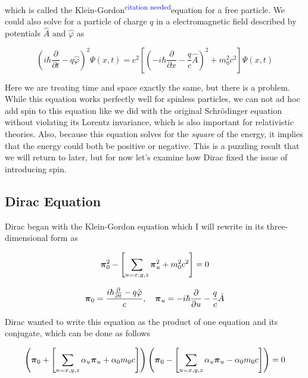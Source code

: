 \documentclass[12pt]{report}
\newcommand{\citethis}{\textsuperscript{\textcolor{blue}{citation needed}}} %
\begin{document}
which is called the Klein-Gordon\citethis equation for a free particle. We could also solve for a particle of charge $q$ in a electromagnetic field described by potentials $\hat{A}$ and $\hat{\varphi}$ as

\begin{equation}
\label{eq:klein-gord_elec_mag}
\left(i\hbar\frac{\partial}{\partial t} -q\hat{\varphi}\right)^{2}\Psi(x, t) = c^{2}\left[\left(-i\hbar\frac{\partial}{\partial x} - \frac{q}{c}\hat{A}\right)^{2} + m_{0}^{2}c^{2}\right]\Psi(x,t)
\end{equation}

Here we are treating time and space exactly the same, but there is a problem. While this equation works perfectly well for spinless particles, we can not ad hoc add spin to this equation like we did with the original Schr\"{o}dinger equation without violating its Lorentz invariance, which is also important for relativistic theories. Also, because this equation solves for the \textit{square} of the energy, it implies that the energy could both be positive or negative. This is a puzzling result that we will return to later, but for now let's examine how Dirac fixed the issue of introducing spin. 

\subsection{Dirac Equation}

Dirac began with the Klein-Gordon equation which I will rewrite in its three-dimensional form as

\begin{equation}
\label{eq:dirac_3D}
{\bf{\pi}}_{0}^{2} - \left[\sum_{u=x,y,z}{\bf{\pi}}_{u}^{2} + m_{0}^{2}c^{2}\right] = 0
\end{equation}

\begin{equation}
\label{eq:dirac_3D_def}
{\bf{\pi}}_{0} = \frac{i\hbar\frac{\partial}{\partial t} -q\hat{\varphi}}{c}, \quad {\bf{\pi}}_{u} = -i\hbar\frac{\partial}{\partial u} - \frac{q}{c}\hat{A}
\end{equation}

Dirac wanted to write this equation as the product of one equation and its conjugate, which can be done as follows

\begin{equation}
\label{eq:dirac_3D_conj}
\left({\bf{\pi}}_{0} + \left[\sum_{u=x,y,z}\alpha_{u}{\bf{\pi}}_{u} + \alpha_{0}m_{0}c\right]\right)\left({\bf{\pi}}_{0} - \left[\sum_{u=x,y,z}\alpha_{u}{\bf{\pi}}_{u} - \alpha_{0}m_{0}c\right]\right) = 0
\end{equation}
\end{document}
